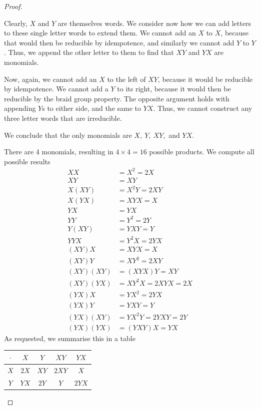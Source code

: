 \begin{proof}
\begin{parts}
	\item Clearly, $X$ and $Y$ are themselves words. We consider now how we can add letters to these single letter words to extend them. We cannot add an $X$ to $X $, because that would then be reducible by idempotence, and similarly we cannot add $Y$ to $Y$. Thus, we append the other letter to them to find that $XY$ and $YX$ are monomials. 

		Now, again, we cannot add an $X$ to the left of $XY$, because it would be reducible by idempotence. We cannot add a $Y$ to its right, because it would then be reducible by the braid group property. The opposite argument holds with appending $Y$s to either side, and the same to $YX$. Thus, we cannot construct any three letter words that are irreducible.

		We conclude that the only monomials are $X,~Y,~XY,$ and $YX$.
	\item There are 4 monomials, resulting in $4\times 4 = 16$ possible products. We compute all possible results
		\begin{align*}
			XX &= X^2 = 2X \\
			XY &= XY \\
			X(XY) &= X^2 Y = 2XY \\
			X(YX) &= XYX = X \\
			YX &= YX \\
			YY &= Y^2 = 2Y \\
			Y(XY) &= YXY = Y \\
			YYX &= Y^2 X = 2YX \\
			(XY)X &= XYX = X \\
			(XY)Y &= XY^2 = 2XY \\
			(XY)(XY) &=  (XYX)Y = XY \\
			(XY)(YX) &= XY^2X=2XYX = 2X\\
			(YX)X &= YX^2 = 2YX \\
			(YX)Y &= YXY = Y \\
			(YX)(XY) &= YX^2Y = 2YXY = 2Y\\
			(YX)(YX) &= (YXY)X = YX  
		\end{align*}
		As requested, we summarise this in a table
\begin{center}
\renewcommand\arraystretch{1.3}
\setlength\doublerulesep{0pt}
\begin{tabular}{c|c|c|c|c|}
$\cdot$ & $X$ & $Y$ & $XY$ & $YX$ \\
\hline
	$X$ & $2X$ & $XY$ & $2XY$ & $X$ \\ 
\hline
$Y$ & $YX$ & $2Y$ & $Y$ & $2YX$ \\ 

\end{tabular}
\end{center}
\end{parts}
\end{proof}
